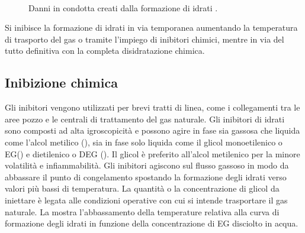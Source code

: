 \begin{figure}[htbp]
    \centering
     \qquad
     \\
\caption{Danni in condotta creati dalla formazione di idrati \parencite{borghi2005idrati}.}
\label{fig:idrati}
\end{figure}

Si inibisce la formazione di idrati in via temporanea aumentando la temperatura di trasporto del gas o tramite l'impiego di inibitori chimici, mentre in via del tutto definitiva con la completa disidratazione chimica.

\subsection{Inibizione chimica}
Gli inibitori vengono utilizzati per brevi tratti di linea, come i collegamenti tra le aree pozzo e le centrali di trattamento del gas naturale. Gli inibitori di idrati sono composti ad alta igroscopicità e possono agire in fase sia gassosa che liquida come l'alcol metilico (), sia in fase solo liquida come il glicol monoetilenico o EG() e dietilenico o DEG (). Il glicol è preferito all'alcol metilenico per la minore volatilità e infiammabilità.
Gli inibitori agiscono sul flusso gassoso in modo da abbassare il punto di congelamento spostando la formazione degli idrati verso valori più bassi di temperatura. La quantità o la concentrazione di glicol da iniettare è legata alle condizioni operative con cui si intende trasportare il gas naturale. La  mostra l'abbassamento della temperature relativa alla curva di formazione degli idrati in funzione della concentrazione di EG disciolto in acqua.

